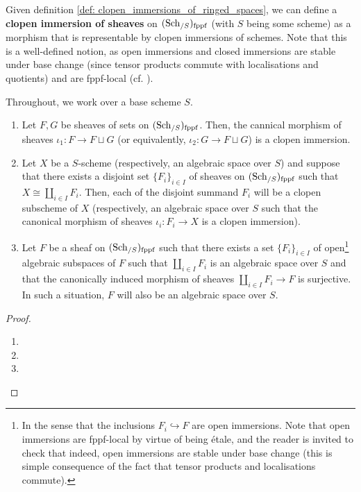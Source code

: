             \begin{remark} \label{remark: clopen_immersions_of_fppf_sheaves}
                Given definition \ref{def: clopen_immersions_of_ringed_spaces}, we can define a \textbf{clopen immersion of sheaves} on $(\mathrm{Sch}_{/S})_{\mathrm{fppf}}$ (with $S$ being some scheme) as a morphism that is representable by clopen immersions of schemes. Note that this is a well-defined notion, as open immersions and closed immersions are stable under base change (since tensor products commute with localisations and quotients) and are fppf-local (cf. \cite[\href{https://stacks.math.columbia.edu/tag/01JY}{Tag 01JY}]{stacks}).
            \end{remark}
            \begin{lemma} \label{lemma: representability_by_schemes_and_algebraic_spaces_of_disjoint_summands}
                Throughout, we work over a base scheme $S$.
                \begin{enumerate}
                    \item Let $F, G$ be sheaves of sets on $(\mathrm{Sch}_{/S})_{\mathrm{fppf}}$. Then, the cannical morphism of sheaves $\iota_1: F \to F \sqcup G$ (or equivalently, $\iota_2: G \to F \sqcup G$) is a clopen immersion.
                    \item Let $X$ be a $S$-scheme (respectively, an algebraic space over $S$) and suppose that there exists a disjoint set $\{F_i\}_{i \in I}$ of sheaves on $(\mathrm{Sch}_{/S})_{\mathrm{fppf}}$ such that $X \cong \coprod_{i \in I} F_i$. Then, each of the disjoint summand $F_i$ will be a clopen subscheme of $X$ (respectively, an algebraic space over $S$ such that the canonical morphism of sheaves $\iota_i: F_i \to X$ is a clopen immersion).
                    \item Let $F$ be a sheaf on $(\mathrm{Sch}_{/S})_{\mathrm{fppf}}$ such that there exists a set $\{F_i\}_{i \in I}$ of open\footnote{In the sense that the inclusions $F_i \hookrightarrow F$ are open immersions. Note that open immersions are fppf-local by virtue of being \'etale, and the reader is invited to check that indeed, open immersions are stable under base change (this is simple consequence of the fact that tensor products and localisations commute).} algebraic subspaces of $F$ such that $\coprod_{i \in I} F_i$ is an algebraic space over $S$ and that the canonically induced morphism of sheaves $\coprod_{i \in I} F_i \to F$ is surjective. In such a situation, $F$ will also be an algebraic space over $S$.
                \end{enumerate}
            \end{lemma}
                \begin{proof}
                    \noindent
                    \begin{enumerate}
                        \item 
                        \item 
                        \item 
                    \end{enumerate}
                \end{proof}
                
